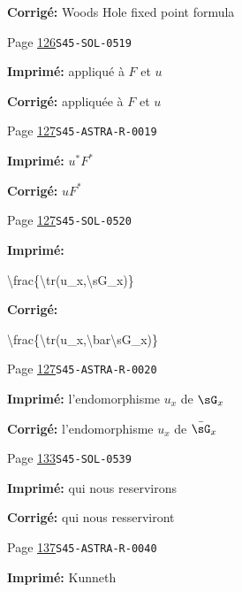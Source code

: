 \begin{description}
\par\noindent\textbf{Corrigé:} Woods Hole fixed point formula
\smallskip
\item[\hypertarget{apparatus:FR-0089}{89}] Page \hyperlink{printpage:fr:126}{126}\quad\texttt{S45-SOL-0519}
\par\noindent\textbf{Imprimé:} appliqué à $F$ et $u$
\par\noindent\textbf{Corrigé:} appliquée à $F$ et $u$
\smallskip
\item[\hypertarget{apparatus:FR-0090}{90}] Page \hyperlink{printpage:fr:127}{127}\quad\texttt{S45-ASTRA-R-0019}
\par\noindent\textbf{Imprimé:} \(u^* F^*\)
\par\noindent\textbf{Corrigé:} \(u F^*\)
\smallskip
\item[\hypertarget{apparatus:FR-0091}{91}] Page \hyperlink{printpage:fr:127}{127}\quad\texttt{S45-SOL-0520}
\par\noindent\textbf{Imprimé:} {\footnotesize\ttfamily\raggedright \textbackslash{}\allowbreak{}frac\{\allowbreak{}\textbackslash{}\allowbreak{}tr(\allowbreak{}u\_\allowbreak{}x,\allowbreak{}\textbackslash{}\allowbreak{}sG\_\allowbreak{}x)\allowbreak{}\}\allowbreak{}\par}
\par\noindent\textbf{Corrigé:} {\footnotesize\ttfamily\raggedright \textbackslash{}\allowbreak{}frac\{\allowbreak{}\textbackslash{}\allowbreak{}tr(\allowbreak{}u\_\allowbreak{}x,\allowbreak{}\textbackslash{}\allowbreak{}bar\textbackslash{}\allowbreak{}sG\_\allowbreak{}x)\allowbreak{}\}\allowbreak{}\par}
\smallskip
\item[\hypertarget{apparatus:FR-0092}{92}] Page \hyperlink{printpage:fr:127}{127}\quad\texttt{S45-ASTRA-R-0020}
\par\noindent\textbf{Imprimé:} l'endomorphisme $u_x$ de $\sG_x$
\par\noindent\textbf{Corrigé:} l'endomorphisme $u_x$ de $\bar\sG_x$
\smallskip
\item[\hypertarget{apparatus:FR-0093}{93}] Page \hyperlink{printpage:fr:133}{133}\quad\texttt{S45-SOL-0539}
\par\noindent\textbf{Imprimé:} qui nous reservirons
\par\noindent\textbf{Corrigé:} qui nous resserviront
\smallskip
\item[\hypertarget{apparatus:FR-0094}{94}] Page \hyperlink{printpage:fr:137}{137}\quad\texttt{S45-ASTRA-R-0040}
\par\noindent\textbf{Imprimé:} Kunneth

\end{description}
